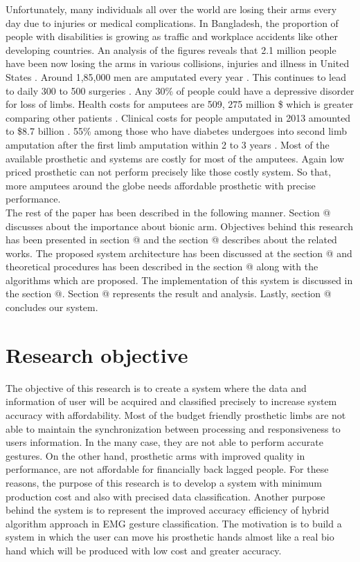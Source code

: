 \documentclass[conference]{IEEEtran}
\makeatletter
\newcommand*{\rom}[1]{\expandafter\@slowromancap\romannumeral #1@}
\makeatother
\begin{document}
Unfortunately, many individuals all over the world are losing their arms every day due to injuries or medical complications. In Bangladesh, the proportion of people with disabilities is growing as traffic and workplace accidents like other developing countries. An analysis of the figures reveals  that  2.1 million people have been now losing the arms in various collisions, injuries and illness in United States \cite{abc20}. Around 1,85,000 men are amputated every year \cite{abc23}. This continues to lead to daily 300 to 500 surgeries \cite{abc23}. Any 30\% of people could have a depressive disorder \cite{abc23} for loss of limbs. Health costs for amputees are 509, 275 million \$ which is greater comparing other patients \cite{abc23}. Clinical costs for people amputated in 2013 amounted to \$8.7 billion \cite{abc23}. 55\% among those who have diabetes  undergoes into second limb amputation after the first limb amputation within 2 to 3 years \cite{abc23}. Most of the available prosthetic and systems are costly for most of the amputees. Again low priced  prosthetic  can not perform precisely like those costly system. So that, more amputees around the globe needs affordable prosthetic with precise performance.\\
The rest of the paper has been described in the following manner. Section \rom{1} discusses about the importance about bionic arm. Objectives behind this research has been presented in section \rom{2} and the section \rom{3} describes about the related works. The proposed system architecture has been discussed at the section \rom{4} and theoretical procedures has been described in the section \rom{5} along with the algorithms which are proposed. The implementation of this system is discussed in the section \rom{6}. Section \rom{7} represents the result and analysis. Lastly, section \rom{8} concludes our system.

\section{Research objective}
The objective of this research is to create a system where the data and information of user will be acquired and classified precisely to increase system accuracy with affordability. Most of the budget friendly prosthetic limbs are not able to maintain the synchronization between processing and responsiveness to users information. In the many case, they are not able to perform accurate gestures. On the other hand, prosthetic arms with improved quality in performance, are not affordable for financially back lagged people. For these reasons, the purpose of this research is to develop a system with minimum production cost and also with precised data classification. Another purpose behind the system is to represent the improved accuracy efficiency of hybrid algorithm approach in EMG gesture classification. The motivation is to build a system in which the user can move his prosthetic hands almost like a real bio hand which will be produced with low cost and greater accuracy.
\end{document}

